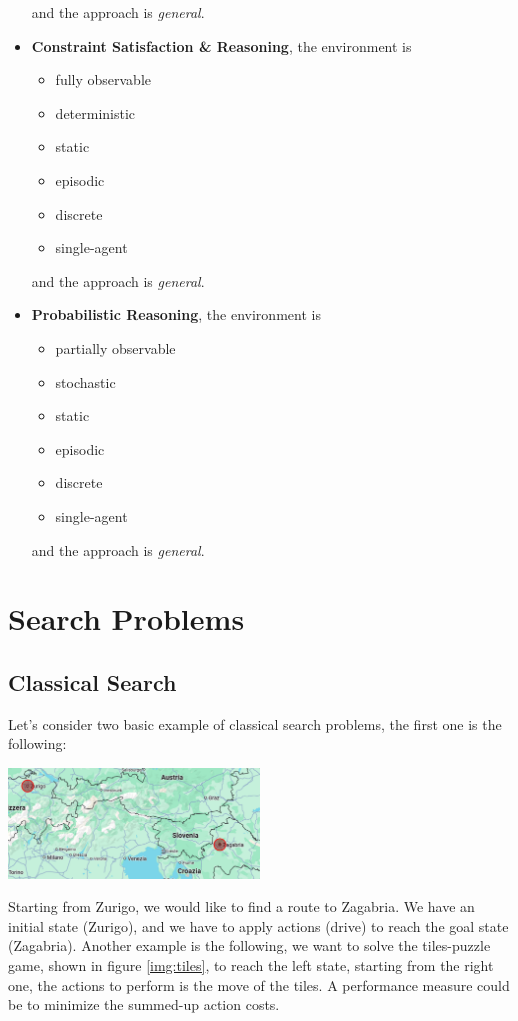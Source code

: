 \documentclass[10pt, letterpaper]{report}
\begin{document}
\begin{itemize}
\begin{itemize}
    \end{itemize}
    and the approach is \textit{general}.
    \item \textbf{Constraint Satisfaction \& Reasoning}, the environment is\begin{itemize}
        \item fully observable
        \item deterministic
        \item static 
        \item episodic    
        \item discrete
        \item single-agent
    \end{itemize}
    and the approach is \textit{general}.
    \item \textbf{Probabilistic Reasoning}, the environment is\begin{itemize}
        \item partially observable
        \item stochastic
        \item static 
        \item episodic    
        \item discrete
        \item single-agent
    \end{itemize}
    and the approach is \textit{general}.
\end{itemize}
\chapter{Search Problems}
\section{Classical Search}
Let's consider two basic example of classical search problems, the first one is the following:\begin{center}
    \includegraphics[width=0.5\textwidth ]{images/map_search.png}
\end{center}
Starting from Zurigo, we would like to find a route to Zagabria. We have an initial state (Zurigo), and we have to apply actions (drive) to reach the goal state (Zagabria). Another example is the following, we want to solve the tiles-puzzle game, shown in figure \ref{img:tiles}, to reach the left state, starting from the right one, the actions to perform is the move of the tiles. A performance measure could be to minimize the summed-up action costs.
\end{document}
